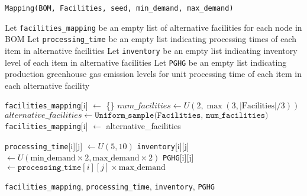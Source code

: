 \documentclass{article}
\begin{document}
	
	\setcounter{algorithm}{3}  %
	
	\begin{algorithm}
		\caption{\texttt{Mapping(BOM, Facilities, seed, min\_demand, max\_demand)}}
		\label{alg:mapping}
		\begin{algorithmic}[1]
			
			\State Let \texttt{facilities\_mapping} be an empty list of alternative facilities for each node in BOM
			\State Let \texttt{processing\_time} be an empty list indicating processing times of each item in alternative facilities
			\State Let \texttt{inventory} be an empty list indicating inventory level of each item in alternative facilities
			\State Let \texttt{PGHG} be an empty list indicating production greenhouse gas emission levels for unit processing time of each item in each alternative facility
			
			 
			\State \texttt{facilities\_mapping}[i] $\gets$ \{\}
			\State $num\_facilities \gets U(2, \max(3, |\text{Facilities}|/3))$
			\State $alternative\_facilities \gets \texttt{Uniform\_sample(Facilities, num\_facilities)}$ 
			\State \texttt{facilities\_mapping}[i] $\gets$ alternative\_facilities
			\EndFor
			
			 
			\State \texttt{processing\_time}[i][j] $\gets U(5,10)$
			\State \texttt{inventory}[i][j] $\gets U(\text{min\_demand} \times 2, \text{max\_demand} \times 2)$
			\State \texttt{PGHG}[i][j] $\gets \texttt{processing\_time}[i][j] \times \text{max\_demand}$
			\EndFor
			\EndFor
			
			\State \Return \texttt{facilities\_mapping}, \texttt{processing\_time}, \texttt{inventory}, \texttt{PGHG}
			
		\end{algorithmic}
	\end{algorithm}
	
\end{document}
